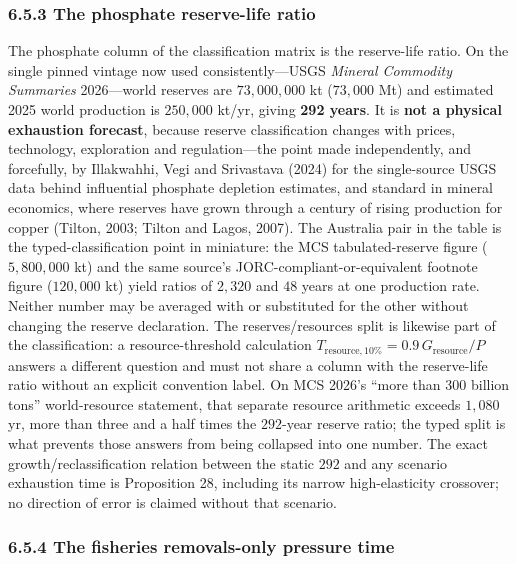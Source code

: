 \documentclass[11pt]{article}
\begin{document}
\subsubsection*{6.5.3 The phosphate reserve-life ratio}\label{653-the-phosphate-reserve-life-ratio}

The phosphate column of the classification matrix is the reserve-life ratio. On the single pinned vintage now used consistently---USGS \emph{Mineral Commodity Summaries} 2026---world reserves are \(73{,}000{,}000\) kt (\(73{,}000\) Mt) and estimated 2025 world production is \(250{,}000\) kt/yr, giving \textbf{292 years}. It is \textbf{not a physical exhaustion forecast}, because reserve classification changes with prices, technology, exploration and regulation---the point made independently, and forcefully, by Illakwahhi, Vegi and Srivastava (2024) for the single-source USGS data behind influential phosphate depletion estimates, and standard in mineral economics, where reserves have grown through a century of rising production for copper (Tilton, 2003; Tilton and Lagos, 2007). The Australia pair in the table is the typed-classification point in miniature: the MCS tabulated-reserve figure (\(5{,}800{,}000\) kt) and the same source's JORC-compliant-or-equivalent footnote figure (\(120{,}000\) kt) yield ratios of \(2{,}320\) and \(48\) years at one production rate. Neither number may be averaged with or substituted for the other without changing the reserve declaration. The reserves/resources split is likewise part of the classification: a resource-threshold calculation \(T_{\mathrm{resource},10\%} = 0.9\, G_{\mathrm{resource}}/P\) answers a different question and must not share a column with the reserve-life ratio without an explicit convention label. On MCS 2026's ``more than 300 billion tons'' world-resource statement, that separate resource arithmetic exceeds \(1{,}080\) yr, more than three and a half times the \(292\)-year reserve ratio; the typed split is what prevents those answers from being collapsed into one number. The exact growth/reclassification relation between the static \(292\) and any scenario exhaustion time is Proposition 28, including its narrow high-elasticity crossover; no direction of error is claimed without that scenario.

\subsubsection*{6.5.4 The fisheries removals-only pressure time}\label{654-the-fisheries-removals-only-pressure-time}
\end{document}
